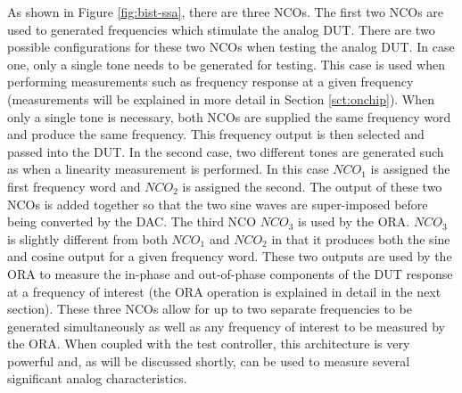 \documentclass[12pt]{report}
\begin{document}
As shown in Figure \ref{fig:bist-ssa}, there are three NCOs.  The first two NCOs are used to generated frequencies which stimulate the analog DUT.  There are two possible configurations for these two NCOs when testing the analog DUT.  In case one, only a single tone needs to be generated for testing.  This case is used when performing measurements such as frequency response at a given frequency (measurements will be explained in more detail in Section \ref{sct:onchip}\cite{jie-journal}).  When only a single tone is necessary, both NCOs are supplied the same frequency word and produce the same frequency\cite{jie}.  This frequency output is then selected and passed into the DUT.  In the second case, two different tones are generated such as when a linearity measurement is performed.  In this case $NCO_1$ is assigned the first frequency word and $NCO_2$ is assigned the second.  The output of these two NCOs is added together so that the two sine waves are super-imposed before being converted by the DAC\cite{jie}.  The third NCO $NCO_3$ is used by the ORA.  $NCO_3$ is slightly different from both $NCO_1$ and $NCO_2$ in that it produces both the sine and cosine output for a given frequency word.  These two outputs are used by the ORA to measure the in-phase and out-of-phase components of the DUT response at a frequency of interest (the ORA operation is explained in detail in the next section)\cite{jie}.   These three NCOs allow for up to two separate frequencies to be generated simultaneously as well as any frequency of interest to be measured by the ORA.  When coupled with the test controller, this architecture is very powerful and, as will be discussed shortly, can be used to measure several significant analog characteristics.
\end{document}
